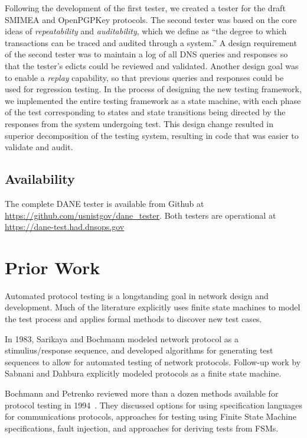 \documentclass[preprint,3p,11pt]{elsarticle}
\begin{document}
Following the development of the first tester, we created a
tester for the draft SMIMEA and OpenPGPKey protocols. The second
tester was based on the core ideas of \emph{repeatability} and \emph{auditability},
which we define as ``the degree to which transactions can be traced
and audited through a system.'' A design requirement of the second tester  was to maintain a log of all DNS queries and responses
so that the tester's edicts could be reviewed and validated. Another
design goal was to enable a \emph{replay} capability, so that previous
queries and responses could be used for regression testing. In the
process of designing the new testing framework, we implemented the entire
testing framework as a state machine, with each phase
of the test corresponding to states and state transitions being
directed by the responses from the system undergoing test. This design
change resulted in superior decomposition of the testing system,
resulting in code that was easier to validate and audit.

\subsection{Availability}

The complete DANE tester is available from Github at
\url{https://github.com/usnistgov/dane_tester}. Both testers are
operational at \url{https://dane-test.had.dnsops.gov}


\section{Prior Work}
Automated protocol testing is a longstanding goal in network design
and development. Much of the literature explicitly uses finite state
machines to model the test process and applies formal methods to
discover new test cases.

In 1983, Sarikaya and Bochmann modeled network protocol as a
stimulius/response sequence, and developed algorithms for generating
test sequences to allow for automated testing of network
protocols\cite{Sarikaya:1983:SIP:1024840.1035264,Sarikaya:1983:SIP:1035237.1035264}.
Follow-up work by Sabnani and Dahbura explicitly modeled protocols as
a finite state machine\cite{Sabnani:1985:NTG:319056.319003,Sabnani:1985:NTG:318951.319003}.

Bochmann and Petrenko reviewed more than a dozen methods available for protocol testing
in 1994~\cite{Bochmann:1994:PTR:186258.187153}. They discussed options
for using specification languages for communications protocols,
approaches for testing using Finite State Machine specifications,
fault injection, and approaches for deriving tests from FSMs.
\end{document}
